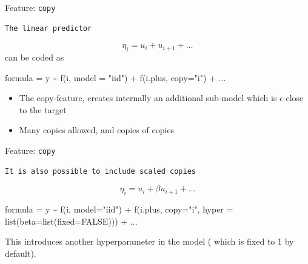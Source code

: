 \documentclass[
  ignorenonframetext,
  handout]{beamer}
\newenvironment{Shaded}{\begin{snugshade}}{\end{snugshade}}
\newcommand{\AttributeTok}[1]{\textcolor[rgb]{0.77,0.63,0.00}{#1}}
\newcommand{\ConstantTok}[1]{\textcolor[rgb]{0.00,0.00,0.00}{#1}}
\newcommand{\FunctionTok}[1]{\textcolor[rgb]{0.00,0.00,0.00}{#1}}
\newcommand{\NormalTok}[1]{#1}
\newcommand{\OtherTok}[1]{\textcolor[rgb]{0.56,0.35,0.01}{#1}}
\newcommand{\SpecialCharTok}[1]{\textcolor[rgb]{0.00,0.00,0.00}{#1}}
\newcommand{\StringTok}[1]{\textcolor[rgb]{0.31,0.60,0.02}{#1}}
\begin{document}
\begin{frame}[fragile]{Feature: \texttt{copy}}
\protect\hypertarget{feature-copy-2}{}
\begin{verbatim}
The linear predictor
\end{verbatim}

\[
\eta_i = u_i + u_{i+1} + \ldots
\] can be coded as

\begin{Shaded}
\begin{Highlighting}[]
\NormalTok{   formula }\OtherTok{=}\NormalTok{ y }\SpecialCharTok{\textasciitilde{}} \FunctionTok{f}\NormalTok{(i, }\AttributeTok{model =} \StringTok{"iid"}\NormalTok{)}
                 \SpecialCharTok{+} \FunctionTok{f}\NormalTok{(i.plus, }\AttributeTok{copy=}\StringTok{"i"}\NormalTok{) }\SpecialCharTok{+}\NormalTok{ ...}
\end{Highlighting}
\end{Shaded}

\begin{itemize}
\item
  The copy-feature, creates internally an additional sub-model which is
  \(\epsilon\)-close to the target
\item
  Many copies allowed, and copies of copies
\end{itemize}
\end{frame}

\begin{frame}[fragile]{Feature: \texttt{copy}}
\protect\hypertarget{feature-copy-3}{}
\begin{verbatim}
It is also possible to include scaled copies
\end{verbatim}

\[
        \eta_i = u_i + \beta u_{i+1} + \ldots
\]

\hfill\break

\begin{Shaded}
\begin{Highlighting}[]
\NormalTok{   formula }\OtherTok{=}\NormalTok{ y }\SpecialCharTok{\textasciitilde{}} \FunctionTok{f}\NormalTok{(i, }\AttributeTok{model=}\StringTok{"iid"}\NormalTok{) }\SpecialCharTok{+}
                 \FunctionTok{f}\NormalTok{(i.plus, }\AttributeTok{copy=}\StringTok{"i"}\NormalTok{,}
                   \AttributeTok{hyper =} \FunctionTok{list}\NormalTok{(}\AttributeTok{beta=}\FunctionTok{list}\NormalTok{(}\AttributeTok{fixed=}\ConstantTok{FALSE}\NormalTok{)))}
                 \SpecialCharTok{+}\NormalTok{ ...}
\end{Highlighting}
\end{Shaded}

This introduces another hyperparameter in the model ( which is fixed to
1 by default).
\end{frame}
\end{document}
